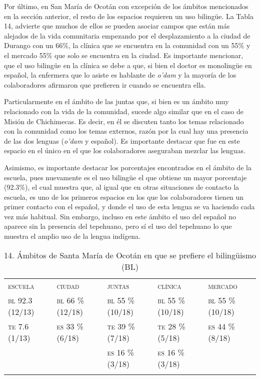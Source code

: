 \documentclass[output=paper]{../langscibook}
\begin{document}
Por último, en San María de Ocotán con excepción de los ámbitos mencionados en la sección anterior, el resto de los espacios requieren un uso bilingüe. La Tabla 14, advierte que muchos de ellos se pueden asociar campos que están más alejados de la vida comunitaria empezando por el desplazamiento a la ciudad de Durango con un 66\%, la clínica que se encuentra en la comunidad con un 55\% y el mercado 55\% que solo se encuentra en la ciudad. Es importante mencionar, que el uso bilingüe en la clínica se debe a que, si bien el doctor es monolingüe en español, la enfermera que lo asiste es hablante de \textit{o'dam} y la mayoría de los colaboradores afirmaron que prefieren ir cuando se encuentra ella.

Particularmente en el ámbito de las juntas que, si bien es un ámbito muy relacionado con la vida de la comunidad, sucede algo similar que en el caso de Misión de Chichimecas. Es decir, en él se discuten tanto los temas relacionado con la comunidad como los temas externos, razón por la cual hay una presencia de las dos lenguas (\textit{o'dam} y español). Es importante destacar que fue en este espacio en el único en el que los colaboradores aseguraban mezclar las lenguas.

Asimismo, es importante destacar los porcentajes encontrados en el ámbito de la escuela, pues nuevamente es el uso bilingüe el que obtiene un mayor porcentaje (92.3\%), el cual muestra que, al igual que en otras situaciones de contacto la escuela, es uno de los primeros espacios en los que los colaboradores tienen un primer contacto con el español, y donde el uso de esta lengua se va haciendo cada vez más habitual. Sin embargo, incluso en este ámbito el uso del español no aparece sin la presencia del tepehuano, pero sí el uso del tepehuano lo que muestra el amplio uso de la lengua indígena.

\begin{table}
\caption{\label{tab:guerrero}14. Ámbitos de Santa María de Ocotán en que se prefiere el bilingüismo (BL)}
\begin{tabularx}{\textwidth}{XXXXX}
\lsptoprule
{\textsc{escuela}} & {\textsc{ciudad}} & {\textsc{juntas}} & {\textsc{clínica}} & {\textsc{mercado}}\\
{\textsc{bl} \textsc{92.3} \textsc{(12/13)}} & {\textsc{bl} \textsc{66} \textsc{\%} \textsc{(12/18)}} & {\textsc{bl} \textsc{55} \textsc{\%} \textsc{(10/18)}} & {\textsc{bl} \textsc{55} \textsc{\%} \textsc{(10/18)}} & {\textsc{bl} \textsc{55} \textsc{\%} \textsc{(10/18)}}\\
{\textsc{te} \textsc{7.6} \textsc{(1/13)}} & {\textsc{es} \textsc{33} \textsc{\%} \textsc{(6/18)}} & {\textsc{te} \textsc{39} \textsc{\%} \textsc{(7/18)}} & {\textsc{te} \textsc{28} \textsc{\%} \textsc{(5/18)}} & {\textsc{es} \textsc{44} \textsc{\%} \textsc{(8/18)}}\\
&  & {\textsc{es} 16 \% (3/18)} & {\textsc{es} 16 \% (3/18)} & \\
\lspbottomrule
\end{tabularx}
\end{table}
\end{document}
